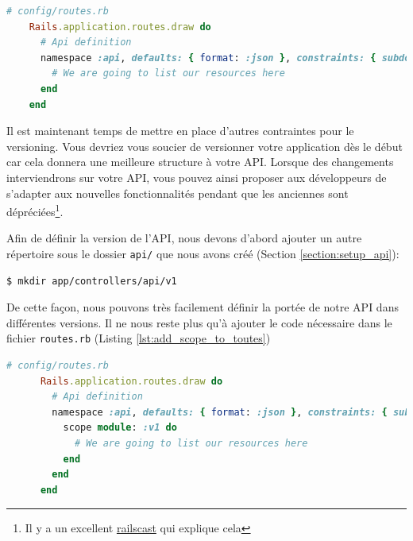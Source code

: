 \documentclass[]{report}
\begin{document}
    \begin{scriptsize}
    \begin{lstlisting}[language=ruby]
    # config/routes.rb
    Rails.application.routes.draw do
      # Api definition
      namespace :api, defaults: { format: :json }, constraints: { subdomain: 'api' }, path: '/'  do
        # We are going to list our resources here
      end
    end
    \end{lstlisting}
    \end{scriptsize}

    Il est maintenant temps de mettre en place d'autres contraintes pour le versioning. Vous devriez vous soucier de versionner votre application dès le début car cela donnera une meilleure structure à votre API. Lorsque des changements interviendrons sur votre API, vous pouvez ainsi proposer aux développeurs de s'adapter aux nouvelles fonctionnalités pendant que les anciennes sont dépréciées\footnote{Il y a un excellent \href{http://railscasts.com/episodes/350-rest-api-versioning}{railscast} qui explique cela}.

    Afin de définir la version de l'API, nous devons d'abord ajouter un autre répertoire sous le dossier \verb|api/| que nous avons créé (Section \ref{section:setup_api}):

    \begin{scriptsize}
      \begin{lstlisting}[language=bash]
      $ mkdir app/controllers/api/v1
      \end{lstlisting}
    \end{scriptsize}

    De cette façon, nous pouvons très facilement définir la portée de notre API dans différentes versions. Il ne nous reste plus qu'à ajouter le code nécessaire dans le fichier \verb|routes.rb| (Listing \ref{lst:add_scope_to_toutes})

    \begin{scriptsize}
      \begin{lstlisting}[language=ruby, caption={Spécification de la version de l'API}, label={lst:add_scope_to_toutes}]
      # config/routes.rb
      Rails.application.routes.draw do
        # Api definition
        namespace :api, defaults: { format: :json }, constraints: { subdomain: 'api' }, path: '/'  do
          scope module: :v1 do
            # We are going to list our resources here
          end
        end
      end
      \end{lstlisting}
    \end{scriptsize}
\end{document}
